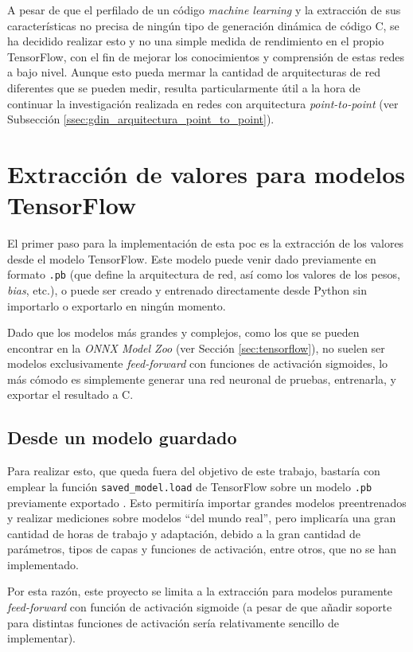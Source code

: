 A pesar de que el perfilado de un código \textit{machine learning} y la extracción de sus características no precisa de ningún tipo de generación dinámica de código C, se ha decidido realizar esto y no una simple medida de rendimiento en el propio TensorFlow, con el fin de mejorar los conocimientos y comprensión de estas redes a bajo nivel. Aunque esto pueda mermar la cantidad de arquitecturas de red diferentes que se pueden medir, resulta particularmente útil a la hora de continuar la investigación realizada en redes con arquitectura \textit{point-to-point} (ver Subsección \ref{ssec:gdin_arquitectura_point_to_point}). 

\section{Extracción de valores para modelos TensorFlow}
\label{sec:extraccion_valores_modelo_tf}
El primer paso para la implementación de esta \acrshort{poc} es la extracción de los valores desde el modelo TensorFlow. Este modelo puede venir dado previamente en formato \texttt{.pb} (que define la arquitectura de red, así como los valores de los pesos, \textit{bias}, etc.), o puede ser creado y entrenado directamente desde Python sin importarlo o exportarlo en ningún momento.

Dado que los modelos más grandes y complejos, como los que se pueden encontrar en la \textit{ONNX Model Zoo} (ver Sección \ref{sec:tensorflow}), no suelen ser modelos exclusivamente \textit{feed-forward} con funciones de activación sigmoides, lo más cómodo es simplemente generar una red neuronal de pruebas, entrenarla, y exportar el resultado a C.

\subsection{Desde un modelo guardado}
\label{ssec:desde_modelo_guardado}
Para realizar esto, que queda fuera del objetivo de este trabajo, bastaría con emplear la función \texttt{saved\_model.load} de TensorFlow sobre un modelo \texttt{.pb} previamente exportado \cite{tensorflow_saved_model}. Esto permitiría importar grandes modelos preentrenados y realizar mediciones sobre modelos ``del mundo real'', pero implicaría una gran cantidad de horas de trabajo y adaptación, debido a la gran cantidad de parámetros, tipos de capas y funciones de activación, entre otros, que no se han implementado.

Por esta razón, este proyecto se limita a la extracción para modelos puramente \textit{feed-forward} con función de activación sigmoide (a pesar de que añadir soporte para distintas funciones de activación sería relativamente sencillo de implementar).

